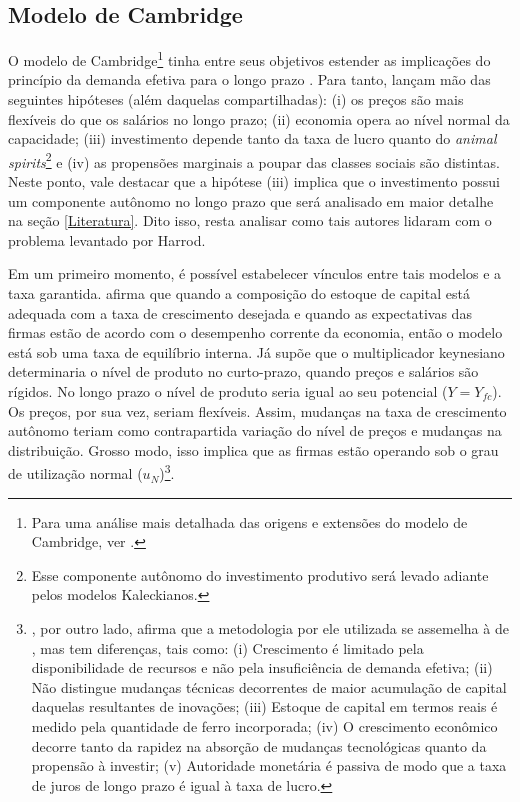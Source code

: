 \subsection{Modelo de Cambridge}

O modelo de Cambridge\footnote{Para uma análise mais detalhada das origens e extensões do modelo de Cambridge, ver \textcite{baranzini_cambridge_2013}.} tinha entre seus objetivos estender as implicações do princípio da demanda efetiva para o longo prazo  \cites{kaldor_alternative_1955}{kaldor_model_1957}{robinson_model_1962}{pasinetti_rate_1962}. Para tanto, lançam mão das seguintes hipóteses (além daquelas compartilhadas): (i) os preços são mais flexíveis do que os salários no longo prazo; (ii) economia opera ao nível normal da capacidade; (iii) investimento depende tanto da taxa de lucro quanto do \textit{animal spirits}\footnote{Esse componente autônomo do investimento produtivo será levado adiante pelos modelos Kaleckianos.} e (iv) as propensões marginais a poupar das classes sociais são distintas. Neste ponto, vale destacar que a hipótese (iii) implica que o investimento possui um componente autônomo no longo prazo que será analisado em maior detalhe na seção \ref{Literatura}. Dito isso, resta analisar como tais autores lidaram com o problema levantado por Harrod.

Em um primeiro momento, é possível estabelecer vínculos entre tais modelos e a taxa garantida. \textcite{robinson_model_1962} afirma que quando a composição do estoque de capital está adequada com a taxa de crescimento desejada e quando as expectativas das firmas estão de acordo com o desempenho corrente da economia, então o modelo está sob uma taxa de equilíbrio interna. Já \textcite{kaldor_alternative_1955} supõe que o multiplicador keynesiano determinaria o nível de produto no curto-prazo, quando preços e salários são rígidos. No longo prazo o nível de produto seria igual ao seu potencial ($Y = Y_{fc}$). Os preços, por sua vez, seriam flexíveis. Assim, mudanças na taxa de crescimento autônomo teriam como contrapartida variação do nível de preços e mudanças na distribuição. Grosso modo, isso implica que as firmas estão operando sob o grau de utilização normal ($u_N$)\footnote{\textcite{kaldor_model_1957}, por outro lado, afirma que a metodologia por ele utilizada se assemelha à de \textcite{harrod_essay_1939}, mas tem diferenças, tais como: (i) Crescimento é limitado pela disponibilidade de recursos e não pela insuficiência de demanda efetiva; (ii) Não distingue mudanças técnicas decorrentes de maior acumulação de capital daquelas resultantes de inovações; (iii) Estoque de capital em termos reais é medido pela quantidade de ferro incorporada; (iv) O crescimento econômico decorre tanto da rapidez na absorção de mudanças tecnológicas quanto da propensão à investir; (v) Autoridade monetária é passiva de modo que a taxa de juros de longo prazo é igual à taxa de lucro.}. 

